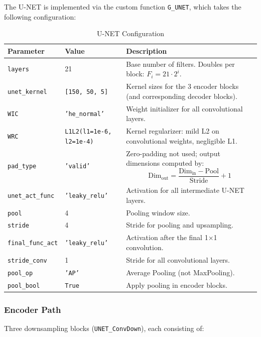 \documentclass[11pt,a4paper]{article}
\begin{document}
The U-NET is implemented via the custom function \texttt{G\_UNET}, which takes the following configuration:

\begin{table}[H]
\centering
\caption{U-NET Configuration}
\begin{tabular}{llp{6cm}}
\toprule
\textbf{Parameter} & \textbf{Value} & \textbf{Description} \\
\midrule
\texttt{layers} & 21 & Base number of filters. Doubles per block: $F_i = 21 \cdot 2^i$. \\
\texttt{unet\_kernel} & {\tt [150, 50, 5]} & Kernel sizes for the 3 encoder blocks (and corresponding decoder blocks). \\
\texttt{WIC} & \texttt{'he\_normal'} & Weight initializer for all convolutional layers. \\
\texttt{WRC} & {\tt L1L2(l1=1e-6, l2=1e-4)} & Kernel regularizer: mild L2 on convolutional weights, negligible L1. \\
\texttt{pad\_type} & \texttt{'valid'} & Zero-padding not used; output dimensions computed by:
\begin{equation*}
\text{Dim}_{\text{out}} = \frac{\text{Dim}_{\text{in}} - \text{Pool}}{\text{Stride}} + 1
\end{equation*} \\
\texttt{unet\_act\_func} & \texttt{'leaky\_relu'} & Activation for all intermediate U-NET layers. \\
\texttt{pool} & 4 & Pooling window size. \\
\texttt{stride} & 4 & Stride for pooling and upsampling. \\
\texttt{final\_func\_act} & \texttt{'leaky\_relu'} & Activation after the final 1×1 convolution. \\
\texttt{stride\_conv} & 1 & Stride for all convolutional layers. \\
\texttt{pool\_op} & \texttt{'AP'} & Average Pooling (not MaxPooling). \\
\texttt{pool\_bool} & \texttt{True} & Apply pooling in encoder blocks. \\
\bottomrule
\end{tabular}
\end{table}

\subsubsection*{Encoder Path}

Three downsampling blocks ({\tt UNET\_ConvDown}), each consisting of:
\end{document}
